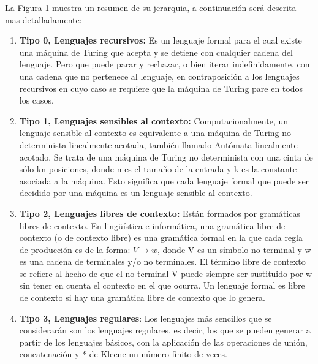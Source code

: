 \documentclass[12pt]{article}
\begin{document}
\vspace{1em}

La Figura 1 muestra un resumen de su jerarquia, a continuación será descrita mas detalladamente:

\begin{enumerate}

\item \textbf{Tipo 0, Lenguajes recursivos:} Es un lenguaje formal para el cual existe una máquina de Turing que acepta y se detiene con cualquier cadena del lenguaje. Pero que puede parar y rechazar, o bien iterar indefinidamente, con una cadena que no pertenece al lenguaje, en contraposición a los lenguajes recursivos en cuyo caso se requiere que la máquina de Turing pare en todos los casos.

\item \textbf{Tipo 1, Lenguajes sensibles al contexto:} Computacionalmente, un lenguaje sensible al contexto es equivalente a una máquina de Turing no determinista linealmente acotada, también llamado Autómata linealmente acotado. Se trata de una máquina de Turing no determinista con una cinta de sólo kn posiciones, donde n es el tamaño de la entrada y k es la constante asociada a la máquina. Esto significa que cada lenguaje formal que puede ser decidido por una máquina es un lenguaje sensible al contexto.

\item \textbf{Tipo 2, Lenguajes libres de contexto:} Están formados por gramáticas libres de contexto. En lingüística e informática, una gramática libre de contexto (o de contexto libre) es una gramática formal en la que cada regla de producción es de la forma: $V \longrightarrow w$, 
donde V es un símbolo no terminal y w es una cadena de terminales y/o no terminales. El término libre de contexto se refiere al hecho de que el no terminal V puede siempre ser sustituido por w sin tener en cuenta el contexto en el que ocurra. Un lenguaje formal es libre de contexto si hay una gramática libre de contexto que lo genera.

\item \textbf{Tipo 3, Lenguajes regulares}: Los lenguajes más sencillos que se considerarán son los lenguajes regulares, es decir, los que se pueden generar a partir de los lenguajes básicos, con la aplicación de las operaciones de unión, concatenación y * de Kleene un número finito de veces.

\end{enumerate}




\end{document}
